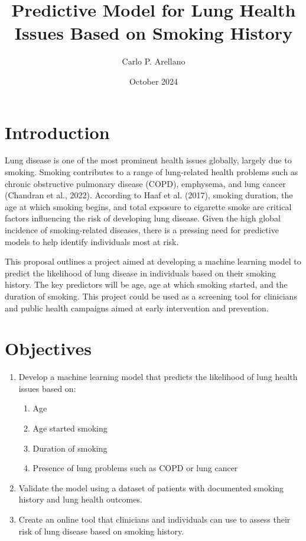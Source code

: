 \documentclass[12pt]{article}
\title{\textbf{Predictive Model for Lung Health Issues Based on Smoking History}}
\author{Carlo P. Arellano}
\date{October 2024}
\begin{document}
\maketitle

\section*{Introduction}

Lung disease is one of the most prominent health issues globally, largely due to smoking. Smoking contributes to a range of lung-related health problems such as chronic obstructive pulmonary disease (COPD), emphysema, and lung cancer (Chandran et al., 2022). According to Haaf et al. (2017), smoking duration, the age at which smoking begins, and total exposure to cigarette smoke are critical factors influencing the risk of developing lung disease. Given the high global incidence of smoking-related diseases, there is a pressing need for predictive models to help identify individuals most at risk.

This proposal outlines a project aimed at developing a machine learning model to predict the likelihood of lung disease in individuals based on their smoking history. The key predictors will be age, age at which smoking started, and the duration of smoking. This project could be used as a screening tool for clinicians and public health campaigns aimed at early intervention and prevention.

\section*{Objectives}

\begin{enumerate}
    \item Develop a machine learning model that predicts the likelihood of lung health issues based on:
    \begin{enumerate}
        \item Age
        \item Age started smoking
        \item Duration of smoking
        \item Presence of lung problems such as COPD or lung cancer
    \end{enumerate}
    \item Validate the model using a dataset of patients with documented smoking history and lung health outcomes.
    \item Create an online tool that clinicians and individuals can use to assess their risk of lung disease based on smoking history.
\end{enumerate}
\end{document}
